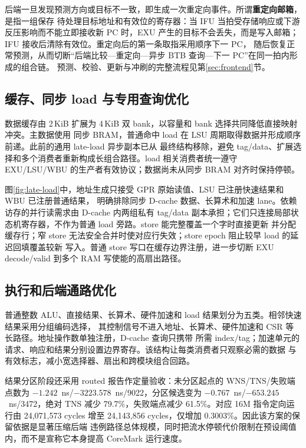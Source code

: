 后端一旦发现预测方向或目标不一致，即生成一次重定向事件。所谓\textbf{重定向邮箱}，是指一组保存
待处理目标地址和有效位的寄存器：当 IFU 当拍受存储响应或下游反压影响而不能立即接收新 PC 时，EXU
产生的目标不会丢失，而是写入邮箱；IFU 接收后清除有效位。重定向后的第一条取指采用顺序下一 PC，
随后恢复正常预测，从而切断“后端比较---重定向---异步 BTB 查询---下一 PC”在同一拍内形成的组合链。
预测、校验、更新与冲刷的完整流程见第\ref{sec:frontend}节。

\subsection{缓存、同步 load 与专用查询优化}

数据缓存由 2\,KiB 扩展为 4\,KiB 双 bank，以容量和 bank 选择共同降低直接映射冲突。主数据使用
同步 BRAM，普通命中 load 在 LSU 周期取得数据并形成顺序前递。此前的通用 late-load 异步副本已从
最终结构移除，避免 tag/data、扩展选择和多个消费者重新构成长组合路径。load 相关消费者统一遵守
EXU/LSU/WBU 的生产者有效协议；数据尚未从同步 BRAM 对齐时保持停顿。



图\ref{fig:late-load}中，地址生成只接受 GPR 原始读值、LSU 已注册快速结果和 WBU 已注册普通结果，
明确排除同步 D-cache 数据、长算术和加速 lane。依赖访存的并行读需求由 D-cache 内两组私有 tag/data
副本承担；它们只连接局部状态机寄存器，不作为普通 load 旁路。store 能完整覆盖一个字时直接更新
并分配缓存行；窄 store 无法安全合并时使对应行失效；store epoch 阻止较早 load 的延迟回填覆盖较新
写入。普通 store 写口在缓存边界注册，进一步切断 EXU decode/valid 到多个 RAM 写使能的高扇出路径。

\subsection{执行和后端通路优化}

普通整数 ALU、直接结果、长算术、硬件加速和 load 结果划分为五类。相邻快速结果采用分组编码选择，
其控制信号不进入地址、长算术、硬件加速和 CSR 等长路径。地址操作数单独注册，D-cache 查询只携带
所需 index/tag；加速单元的请求、响应和结果分别设置边界寄存。该结构让每类消费者只观察必需的数据
与有效标志，减小宽选择器、扇出和跨模块组合回路。

结果分区阶段还采用 routed 报告作定量验收：未分区起点的 WNS/TNS/失败端点数为
$-1.242$~ns/$-3223.578$~ns/9022，分区候选变为 $-0.767$~ns/$-653.245$~ns/3472，绝对 TNS
减少 79.7\%，失败端点减少 61.5\%。对应 16M 指令定向运行由
24,071,573 cycles 增至 24,143,856 cycles，仅增加 0.3003\%。因此该方案的保留依据是显著压缩后端
违例路径总体规模，同时把流水停顿代价限制在预设阈值内，而不是宣称它本身提高 CoreMark 运行速度。

